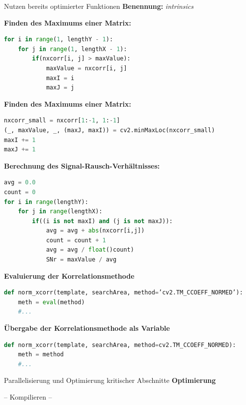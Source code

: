 \begin{frame}{Nutzen bereits optimierter Funktionen}
	\textbf{Benennung:} \textit{intrinsics}
	
	\textbf{Finden des Maximums einer Matrix:}
	\begin{lstlisting}[language=Python]
for i in range(1, lengthY - 1):
	for j in range(1, lengthX - 1):
		if(nxcorr[i, j] > maxValue):
			maxValue = nxcorr[i, j]
			maxI = i
			maxJ = j
	\end{lstlisting}
	
	\framebreak
	
	\textbf{Finden des Maximums einer Matrix:}
	\begin{lstlisting}[language=Python]
nxcorr_small = nxcorr[1:-1, 1:-1]
(_, maxValue, _, (maxJ, maxI)) = cv2.minMaxLoc(nxcorr_small)
maxI += 1
maxJ += 1
	\end{lstlisting}
	
	\framebreak
	
	\textbf{Berechnung des Signal-Rausch-Verhältnisses:}
	\begin{lstlisting}[language=Python]
avg = 0.0
count = 0
for i in range(lengthY):
	for j in range(lengthX):
		if((i is not maxI) and (j is not maxJ)):
			avg = avg + abs(nxcorr[i,j])
			count = count + 1
			avg = avg / float()count)
			SNr = maxValue / avg
	\end{lstlisting}
	
	\framebreak
	
	\textbf{Evaluierung der Korrelationsmethode}
	\begin{lstlisting}[language=Python]
def norm_xcorr(template, searchArea, method=’cv2.TM_CCOEFF_NORMED’):
	meth = eval(method)
	#...
	\end{lstlisting}
	
	\framebreak
	
	\textbf{Übergabe der Korrelationsmethode als Variable}
	\begin{lstlisting}[language=Python]
def norm_xcorr(template, searchArea, method=cv2.TM_CCOEFF_NORMED):
	meth = method
	#...
	\end{lstlisting}
\end{frame}

\begin{frame}{Parallelisierung und Optimierung kritischer Abschnitte}
	\centering
	\LARGE
	\textbf{Optimierung}
	
	\vspace{0.5cm}
	
	\large
	-- Kompilieren --
\end{frame}

